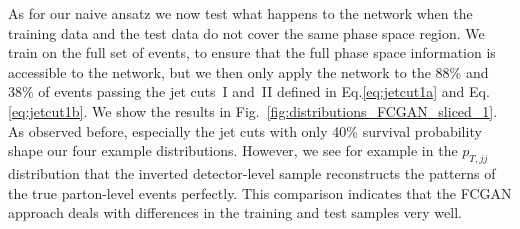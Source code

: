 As for our naive ansatz we now test what happens to the network when
the training data and the test data do not cover the same phase space
region. We train on the full set of events, to ensure that the full
phase space information is accessible to the network, but we then only
apply the network to the 88\% and 38\% of events passing the jet
cuts~I and~II defined in Eq.\eqref{eq:jetcut1a} and
Eq.\eqref{eq:jetcut1b}. We show the results in
Fig.~\ref{fig:distributions_FCGAN_sliced_1}. As observed before,
especially the jet cuts with only 40\% survival probability shape our
four example distributions. However, we see for example in the
$p_{T,jj}$ distribution that the inverted detector-level sample
reconstructs the patterns of the true parton-level events
perfectly. This comparison indicates that the FCGAN approach deals
with differences in the training and test samples very well.

